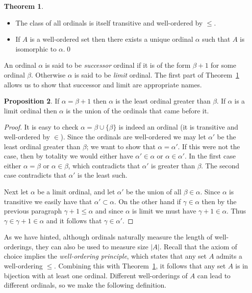 \documentclass[11pt,oneside]{amsart}
\theoremstyle{definition}
\newtheorem{thm}{Theorem}[section]
\newtheorem{prop}[thm]{Proposition}
\theoremstyle{definition}
\theoremstyle{remark}
\begin{document}
\begin{thm}\
  \label{thm:ordinals}
  \begin{itemize}
  \item The class of all ordinals is itself transitive and well-ordered by $\leq$.
  \item If $A$ is a well-ordered set then there exists a unique ordinal $\alpha$ such that $A$ is isomorphic to $\alpha$.\qed
  \end{itemize}
\end{thm}

An ordinal $\alpha$ is said to be \emph{successor} ordinal if it is of the form $\beta+1$ for some ordinal $\beta$. Otherwise $\alpha$ is said to be \emph{limit} ordinal. The first part of Theorem~\ref{thm:ordinals} allows us to show that successor and limit are appropriate names.

\begin{prop}
  If $\alpha=\beta+1$ then $\alpha$ is the least ordinal greater than $\beta$. If $\alpha$ is a limit ordinal then $\alpha$ is the union of the ordinals that came before it.
\end{prop}

\begin{proof}
  It is easy to check $\alpha=\beta\cup\{\beta\}$ is indeed an ordinal (it is transitive and well-ordered by $\in$). Since the ordinals are well-ordered we may let $\alpha'$ be the least ordinal greater than $\beta$; we want to show that $\alpha=\alpha'$. If this were not the case, then by totality we would either have $\alpha'\in\alpha$ or $\alpha\in\alpha'$. In the first case either $\alpha=\beta$ or $\alpha\in\beta$, which contradicts that $\alpha'$ is greater than $\beta$. The second case contradicts that $\alpha'$ is the least such.

  Next let $\alpha$ be a limit ordinal, and let $\alpha'$ be the union of all $\beta\in\alpha$. Since $\alpha$ is transitive we easily have that $\alpha'\subset\alpha$. On the other hand if $\gamma\in\alpha$ then by the previous paragraph $\gamma+1\leq\alpha$ and since $\alpha$ is limit we must have $\gamma+1\in\alpha$. Thus $\gamma\in\gamma+1\in\alpha$ and it follows that $\gamma\in\alpha'$.
\end{proof}

As we have hinted, although ordinals naturally measure the length of well-orderings, they can also be used to measure size $|A|$. Recall that the axiom of choice implies the \emph{well-ordering principle}, which states that any set $A$ admits a well-ordering $\leq$. Combining this with Theorem~\ref{thm:ordinals}, it follows that any set $A$ is in bijection with at least one ordinal. Different well-orderings of $A$ can lead to different ordinals, so we make the following definition.
\end{document}
